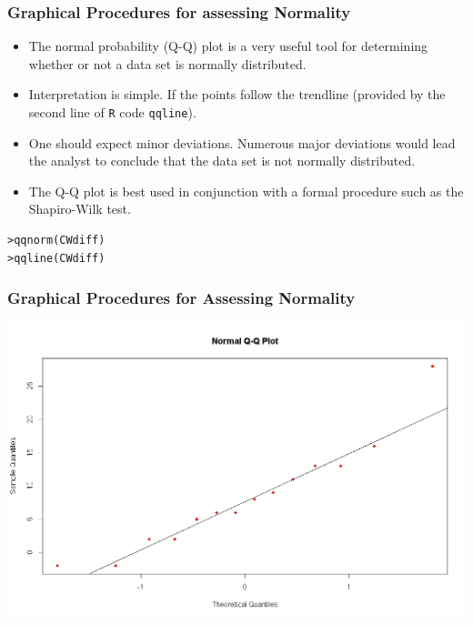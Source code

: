 \documentclass[a4]{beamer}
\begin{document}
\begin{frame}[fragile]
\frametitle{Graphical Procedures for assessing Normality}

\begin{itemize}
\item The normal probability (Q-Q) plot is a very useful tool for determining whether or not a data set is normally distributed.
\item Interpretation is simple. If the points follow the trendline (provided by the second line of \texttt{R} code \texttt{qqline}).
\item One should expect minor deviations. Numerous major deviations would lead the analyst to conclude that the data set is not normally distributed.
\item The Q-Q plot is best used in conjunction with a formal procedure such as the Shapiro-Wilk test.
\end{itemize}

\begin{verbatim}
>qqnorm(CWdiff)
>qqline(CWdiff)
\end{verbatim}

\end{frame}


\begin{frame}
\frametitle{Graphical Procedures for Assessing Normality}

\begin{center}
\includegraphics[scale=0.32]{10AQQplot}
\end{center}
\end{frame}
\end{document}
